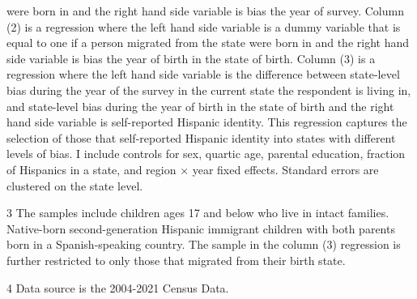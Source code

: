 \begin{table}[H]
{\begin{threeparttable}
\begin{tablenotes}
{                      were born in and the right hand side variable is bias the year of survey.
                      Column (2) is a regression where the left hand side variable is 
                      a dummy variable that is equal to one if a person migrated from the state
                      were born in and the right hand side variable is bias the year of birth in the state of birth.
                      Column (3) is a regression where the left hand side variable is 
                      the difference between state-level bias during the year of the survey in the current state the 
                      respondent is living in, and state-level bias during the year of birth in the state of birth 
                      and the right hand side variable is self-reported Hispanic identity. This regression captures
                      the selection of those that self-reported Hispanic identity into states with different levels of bias.
                      I include controls for sex, quartic age, parental education, fraction of Hispanics in a state, and region × year fixed effects.
                      Standard errors are clustered on the state level.}
\item[3] \footnotesize{The samples include children ages 17 and below who live in intact families. 
                      Native-born second-generation Hispanic immigrant children with both
                      parents born in a Spanish-speaking country. The sample in the column (3) regression is further restricted to only those that migrated from their birth state.}
\item[4] \footnotesize{Data source is the 2004-2021 Census Data.}
\end{tablenotes}
\end{threeparttable}}
\end{table}
